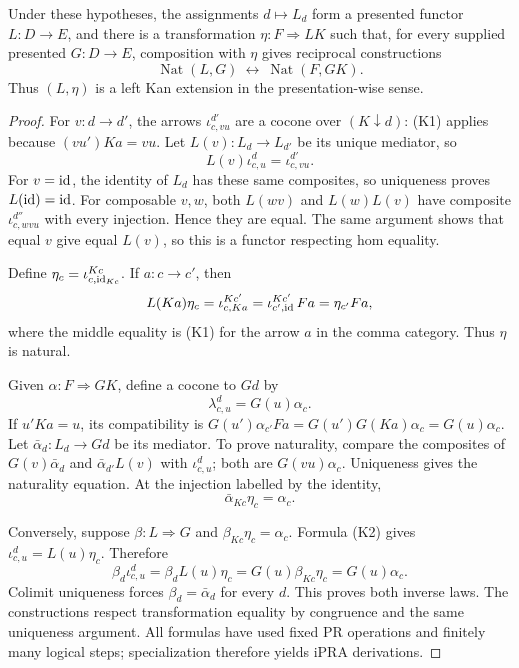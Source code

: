 \begin{theorem}\label{thm:kan}
Under these hypotheses, the assignments $d\mapsto L_d$ form a
presented functor $L:D\to E$, and there is a transformation
$\eta:F\Rightarrow LK$ such that, for every supplied presented
$G:D\to E$, composition with $\eta$ gives reciprocal constructions
\[
 \operatorname{Nat}(L,G)\ \longleftrightarrow\
 \operatorname{Nat}(F,GK).
\]
Thus $(L,\eta)$ is a left Kan extension in the presentation-wise sense.
\end{theorem}
\begin{proof}
For $v:d\to d'$, the arrows $\iota^{d'}_{c,vu}$ are a cocone over
$(K\downarrow d)$: (K1) applies because $(vu')Ka=vu$.
Let $L(v):L_d\to L_{d'}$ be its unique mediator, so
\[
                    L(v)\iota^d_{c,u}=\iota^{d'}_{c,vu}.
                                                               \tag{K2}
\]
For $v=\operatorname{id}$, the identity of $L_d$ has these same composites, so
uniqueness proves $L(\operatorname{id})=\operatorname{id}$. For composable $v,w$, both $L(wv)$
and $L(w)L(v)$ have composite $\iota^{d''}_{c,wvu}$ with every
injection. Hence they are equal. The same argument shows that equal
$v$ give equal $L(v)$, so this is a functor respecting hom equality.

Define $\eta_c=\iota^{Kc}_{c,\operatorname{id}_{Kc}}$. If $a:c\to c'$, then
\[
 L(Ka)\eta_c=\iota^{Kc'}_{c,Ka}
            =\iota^{Kc'}_{c',\operatorname{id}}\,Fa=\eta_{c'}Fa,
\]
where the middle equality is (K1) for the arrow $a$ in the comma
category. Thus $\eta$ is natural.

Given $\alpha:F\Rightarrow GK$, define a cocone to $Gd$ by
\[
                   \lambda^d_{c,u}=G(u)\alpha_c.
\]
If $u'Ka=u$, its compatibility is
$G(u')\alpha_{c'}Fa=G(u')G(Ka)\alpha_c=G(u)\alpha_c$.
Let $\bar\alpha_d:L_d\to Gd$ be its mediator. To prove naturality,
compare the composites of $G(v)\bar\alpha_d$ and
$\bar\alpha_{d'}L(v)$ with $\iota^d_{c,u}$; both are
$G(vu)\alpha_c$. Uniqueness gives the naturality equation.
At the injection labelled by the identity,
\[
                  \bar\alpha_{Kc}\eta_c=\alpha_c.           \tag{K3}
\]

Conversely, suppose $\beta:L\Rightarrow G$ and
$\beta_{Kc}\eta_c=\alpha_c$. Formula (K2) gives
$\iota^d_{c,u}=L(u)\eta_c$. Therefore
\[
 \beta_d\iota^d_{c,u}
   =\beta_dL(u)\eta_c
   =G(u)\beta_{Kc}\eta_c
   =G(u)\alpha_c.
\]
Colimit uniqueness forces $\beta_d=\bar\alpha_d$ for every $d$.
This proves both inverse laws. The constructions respect transformation
equality by congruence and the same uniqueness argument.
All formulas have used fixed PR operations and finitely many logical
steps; specialization therefore yields iPRA derivations.
\end{proof}

